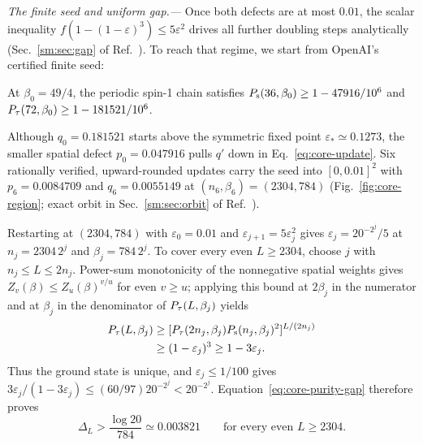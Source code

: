 \emph{The finite seed and uniform gap.---}
Once both defects are at most $0.01$, the scalar inequality
$f(1-(1-\varepsilon)^3)\le5\varepsilon^2$ drives all further doubling
steps analytically (Sec.~\ref{sm:sec:gap} of Ref.~\cite{SM}). To
reach that regime, we start from OpenAI's certified finite seed:

\begin{lemma}
 \label{lem:arxiv-seed36}
 At $\beta_0=49/4$, the periodic spin-1 chain satisfies
 $P_{\mathrm s}(36,\beta_0)\ge1-47916/10^6$ and
 $P_{\tau}(72,\beta_0)\ge1-181521/10^6$.
\end{lemma}

Although $q_0=0.181521$ starts above the symmetric fixed point
$\varepsilon_*\simeq0.1273$, the smaller spatial defect
$p_0=0.047916$ pulls $q'$ down in Eq.~\eqref{eq:core-update}. Six
rationally verified, upward-rounded updates carry the seed into
$[0,0.01]^2$ with $p_6=0.0084709$ and $q_6=0.0055149$ at
$(n_6,\beta_6)=(2304,784)$ (Fig.~\ref{fig:core-region}; exact orbit
in Sec.~\ref{sm:sec:orbit} of Ref.~\cite{SM}).

Restarting at $(2304,784)$ with $\varepsilon_0=0.01$ and
$\varepsilon_{j+1}=5\varepsilon_j^2$ gives
$\varepsilon_j=20^{-2^j}/5$ at $n_j=2304\,2^j$ and
$\beta_j=784\,2^j$. To cover every even $L\ge2304$, choose $j$ with
$n_j\le L\le2n_j$. Power-sum monotonicity of the nonnegative spatial
weights gives $Z_v(\beta)\le Z_u(\beta)^{v/u}$ for even $v\ge u$;
applying this bound at $2\beta_j$ in the numerator and at $\beta_j$ in
the denominator of $P_{\tau}(L,\beta_j)$ yields
\begin{align}
 P_{\tau}(L,\beta_j)
 &\ge[P_{\tau}(2n_j,\beta_j)P_{\mathrm s}(n_j,\beta_j)^2]^{L/(2n_j)}
 \nonumber\\
 &\ge(1-\varepsilon_j)^3\ge1-3\varepsilon_j.
 \label{eq:core-interpolation}
\end{align}
Thus the ground state is unique, and $\varepsilon_j\le1/100$ gives
$3\varepsilon_j/(1-3\varepsilon_j)\le(60/97)20^{-2^j}<20^{-2^j}$.
Equation~\eqref{eq:core-purity-gap} therefore proves
\begin{equation}
 \Delta_L>\frac{\log20}{784}\simeq0.003821
 \qquad\text{for every even }L\ge2304.
 \label{eq:core-gap}
\end{equation}

